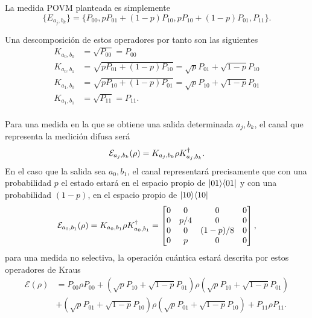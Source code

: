 La medida POVM planteada es simplemente \[\{E_{a_j, b_k}\}= \{P_{00},p P_{01}+(1-p)P_{10},p P_{10}+(1-p)P_{01},P_{11}\}.\] 

Una descomposición de estos operadores por tanto son las siguientes
\begin{equation}
    \begin{split}
        K_{a_0,b_0}&=\sqrt{P_{00}}=P_{00}\\
        K_{a_0,b_1}&=\sqrt{p P_{01}+(1-p)P_{10}}=\sqrt{p}P_{01}+\sqrt{1-p}P_{10}\\
        K_{a_1,b_0}&=\sqrt{p P_{10}+(1-p)P_{01}}=\sqrt{p}P_{10}+\sqrt{1-p}P_{01}\\
        K_{a_1,b_1}&=\sqrt{P_{11}}=P_{11}.\\
\end{split}
\end{equation} 

Para una medida en la que se obtiene una salida determinada $a_j,b_k$, el canal que representa la medición difusa será \[\mathcal{E}_{a_j,b_k}(\rho)=K_{a_j,b_k}\rho K_{a_j,b_k}^\dagger.\] En el caso que la salida sea $a_0,b_1$, el canal representará precisamente que con una probabilidad $p$ el estado estará en el espacio propio de $|01\rangle \langle 01|$ y con una probabilidad $(1-p)$, en el espacio propio de $|10\rangle \langle10|$
\[\mathcal{E}_{a_0,b_1}(\rho)=K_{a_0,b_1}\rho K_{a_0,b_1}^\dagger=\begin{bmatrix}
    0&0&0&0\\
    0&p/4&0&0\\
    0&0&(1-p)/8&0\\
    0&p&0&0\\
\end{bmatrix},\]
para una medida no selectiva, la operación cuántica estará descrita por estos operadores de Kraus \[
\begin{split}
    \mathcal{E}(\rho)&=  P_{00}\rho P_{00}+(\sqrt{p}P_{10}+\sqrt{1-p}P_{01})\rho(\sqrt{p}P_{10}+\sqrt{1-p}P_{01})\\
    &+ (\sqrt{p}P_{01}+\sqrt{1-p}P_{10})\rho (\sqrt{p} P_{01}+\sqrt{1-p}P_{10})+P_{11}\rho P_{11}.\\
\end{split}
\]


